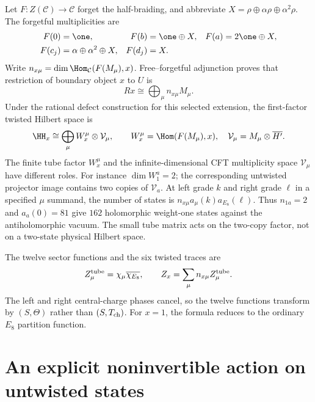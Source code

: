 Let $F:Z(\mathcal C)\to\mathcal C$ forget the half-braiding,
and abbreviate $X=\rho\oplus\alpha\rho\oplus\alpha^2\rho$.
The forgetful multiplicities are
\begin{align}
 F(0)&=\one,&F(b)&=\one\oplus X,&F(a)&=2\one\oplus X,\notag\\
 F(c_j)&=\alpha\oplus\alpha^2\oplus X,&
 F(d_j)&=X.
 \label{eq:defect-forgetful}
\end{align}
Write $n_{x\mu}=\dim\Hom_{\mathcal C}(F(M_\mu),x)$.
Free--forgetful adjunction proves that restriction of boundary
object $x$ to $U$ is
\[
 Rx\cong\bigoplus_\mu n_{x\mu}M_\mu.
\]
Under the rational defect construction for this selected
extension, the first-factor twisted Hilbert space is
\begin{equation}
 \HH_x\cong\bigoplus_\mu W_x^\mu\otimes\mathcal V_\mu,
 \qquad W_x^\mu=\Hom(F(M_\mu),x),
 \quad\mathcal V_\mu=M_\mu\otimes\overline{H'}.
 \label{eq:defect-tube-decomposition}
\end{equation}
The finite tube factor $W_x^\mu$ and the infinite-dimensional
CFT multiplicity space $\mathcal V_\mu$ have different roles.
For instance $\dim W_1^a=2$; the corresponding untwisted
projector image contains two copies of $\mathcal V_a$.
At left grade $k$ and right grade $\ell$ in a specified $\mu$
summand, the number of states is
$n_{x\mu}a_\mu(k)a_{E_8}(\ell)$. Thus $n_{1a}=2$ and
$a_a(0)=81$ give $162$ holomorphic weight-one states against
the antiholomorphic vacuum. The small tube matrix acts on the
two-copy factor, not on a two-state physical Hilbert space.

The twelve sector functions and the six twisted traces are
\begin{equation}
 Z_\mu^{\rm tube}=\chi_\mu\overline{\chi_{E_8}},
 \qquad Z_x=\sum_\mu n_{x\mu}Z_\mu^{\rm tube}.
 \label{eq:defect-sector-functions}
\end{equation}
The left and right central-charge phases cancel, so the twelve
functions transform by $(S,\Theta)$ rather than
$(S,T_{\rm ch})$. For $x=1$, the formula reduces to the ordinary
$E_8$ partition function.

\section{An explicit noninvertible action on untwisted states}

